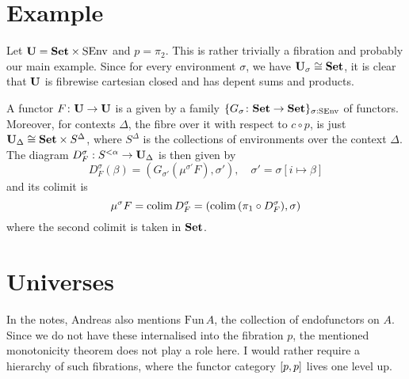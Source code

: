 \documentclass[runningheads,envcountsame,envcountsect,orivec]{llncs}
\begin{document}
\section{Example}
Let $\mathbf{U} = \mathbf{Set} \times \mathrm{SEnv}$ and $p = \pi_2$.
This is rather trivially a fibration and probably our main example.
Since for every environment $\sigma$, we have $\mathbf{U}_\sigma \cong \mathbf{Set}$, it
is clear that $\mathbf{U}$ is fibrewise cartesian closed and has depent sums and
products.

A functor $F \colon \mathbf{U} \rightarrow \mathbf{U}$ is a given by a family
$\{G_\sigma \colon \mathbf{Set} \rightarrow \mathbf{Set}\}_{\sigma : \mathrm{SEnv}}$ of functors.
Moreover, for contexts $\Delta$, the fibre over it with respect to $c \circ p$,
is just $\mathbf{U}_\Delta \cong \mathbf{Set} \times S^\Delta$, where $S^\Delta$ is the
collections of environments over the context $\Delta$.
The diagram $D^\sigma_F : S^{< \alpha} \to \mathbf{U}_\Delta$ is then given by
\begin{equation*}
  D^\sigma_F(\beta) = (G_{\sigma'}(\mu^{\sigma'}F), \sigma'),
  \quad \sigma' = \sigma[i \mapsto \beta]
\end{equation*}
and its colimit is
\begin{equation*}
  \mu^{\sigma}F = \operatorname{colim} D^\sigma_F
  = (\operatorname{colim} \, (\pi_1 \circ D^{\sigma}_F), \sigma)
\end{equation*}
where the second colimit is taken in $\mathbf{Set}$.


\section{Universes}
In the notes, Andreas also mentions $\mathrm{Fun} \, A$, the collection of
endofunctors on $A$.
Since we do not have these internalised into the fibration $p$, the mentioned
monotonicity theorem does not play a role here.
I would rather require a hierarchy of such fibrations, where the functor
category $\left[ p, p \right]$ lives one level up.

%
%
\end{document}

